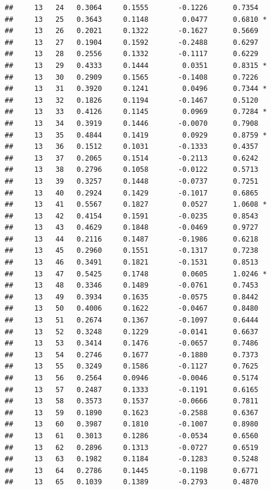 \documentclass[
]{article}
\begin{document}
\begin{verbatim}
##     13   24   0.3064     0.1555       -0.1226      0.7354  
##     13   25   0.3643     0.1148        0.0477      0.6810 *
##     13   26   0.2021     0.1322       -0.1627      0.5669  
##     13   27   0.1904     0.1592       -0.2488      0.6297  
##     13   28   0.2556     0.1332       -0.1117      0.6229  
##     13   29   0.4333     0.1444        0.0351      0.8315 *
##     13   30   0.2909     0.1565       -0.1408      0.7226  
##     13   31   0.3920     0.1241        0.0496      0.7344 *
##     13   32   0.1826     0.1194       -0.1467      0.5120  
##     13   33   0.4126     0.1145        0.0969      0.7284 *
##     13   34   0.3919     0.1446       -0.0070      0.7908  
##     13   35   0.4844     0.1419        0.0929      0.8759 *
##     13   36   0.1512     0.1031       -0.1333      0.4357  
##     13   37   0.2065     0.1514       -0.2113      0.6242  
##     13   38   0.2796     0.1058       -0.0122      0.5713  
##     13   39   0.3257     0.1448       -0.0737      0.7251  
##     13   40   0.2924     0.1429       -0.1017      0.6865  
##     13   41   0.5567     0.1827        0.0527      1.0608 *
##     13   42   0.4154     0.1591       -0.0235      0.8543  
##     13   43   0.4629     0.1848       -0.0469      0.9727  
##     13   44   0.2116     0.1487       -0.1986      0.6218  
##     13   45   0.2960     0.1551       -0.1317      0.7238  
##     13   46   0.3491     0.1821       -0.1531      0.8513  
##     13   47   0.5425     0.1748        0.0605      1.0246 *
##     13   48   0.3346     0.1489       -0.0761      0.7453  
##     13   49   0.3934     0.1635       -0.0575      0.8442  
##     13   50   0.4006     0.1622       -0.0467      0.8480  
##     13   51   0.2674     0.1367       -0.1097      0.6444  
##     13   52   0.3248     0.1229       -0.0141      0.6637  
##     13   53   0.3414     0.1476       -0.0657      0.7486  
##     13   54   0.2746     0.1677       -0.1880      0.7373  
##     13   55   0.3249     0.1586       -0.1127      0.7625  
##     13   56   0.2564     0.0946       -0.0046      0.5174  
##     13   57   0.2487     0.1333       -0.1191      0.6165  
##     13   58   0.3573     0.1537       -0.0666      0.7811  
##     13   59   0.1890     0.1623       -0.2588      0.6367  
##     13   60   0.3987     0.1810       -0.1007      0.8980  
##     13   61   0.3013     0.1286       -0.0534      0.6560  
##     13   62   0.2896     0.1313       -0.0727      0.6519  
##     13   63   0.1982     0.1184       -0.1283      0.5248  
##     13   64   0.2786     0.1445       -0.1198      0.6771  
##     13   65   0.1039     0.1389       -0.2793      0.4870  

\end{verbatim}
\end{document}
